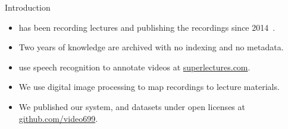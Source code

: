 \begin{frame}{Introduction }
\begin{itemize}
\item<1-7>   has been \alert{recording lectures} and publishing the
  recordings since 2014~\cite{hladkaliska03lectures}.
\item<3-7> Two years of knowledge are archived with \alert{no indexing} and
  \alert{no metadata}.
\item<4-7>  use \alert{speech recognition} to annotate videos at
  \href{https://superlectures.com/}{superlectures.com}.
\item<5-7> We use \alert{digital image processing} to map recordings to lecture
  materials.
\item<7> We published our system, and datasets under \alert{open licenses}
  at \href{https://github.com/video699}{github.com/video699}.
\end{itemize}


\end{frame}
